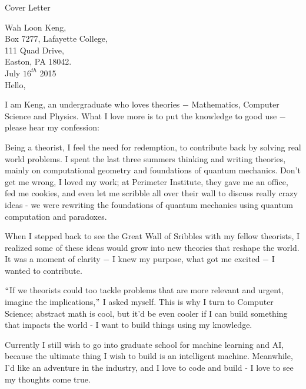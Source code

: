 \documentclass{resume} %
\begin{document}
\begin{rSection}{Cover Letter}


\end{rSection}


Wah Loon Keng,\\
Box 7277, Lafayette College,\\
111 Quad Drive,\\
Easton, PA 18042.\\

July $16^{th}$ 2015\\


Hello,

I am Keng, an undergraduate who loves theories $-$ Mathematics, Computer Science and Physics. What I love more is to put the knowledge to good use $-$ please hear my confession:

Being a theorist, I feel the need for redemption, to contribute back by solving real world problems. I spent the last three summers thinking and writing theories, mainly on computational geometry and foundations of quantum mechanics. Don't get me wrong, I loved my work; at Perimeter Institute, they gave me an office, fed me cookies, and even let me scribble all over their wall to discuss really crazy ideas - we were rewriting the foundations of quantum mechanics using quantum computation and paradoxes.

When I stepped back to see the Great Wall of Sribbles with my fellow theorists, I realized some of these ideas would grow into new theories that reshape the world. It was a moment of clarity $-$ I knew my purpose, what got me excited $-$ I wanted to contribute.

$``$If we theorists could too tackle problems that are more relevant and urgent, imagine the implications,$"$ I asked myself. This is why I turn to Computer Science; abstract math is cool, but it'd be even cooler if I can build something that impacts the world - I want to build things using my knowledge.

Currently I still wish to go into graduate school for machine learning and AI, because the ultimate thing I wish to build is an intelligent machine. Meanwhile, I'd like an adventure in the industry, and I love to code and build - I love to see my thoughts come true.
\end{document}
